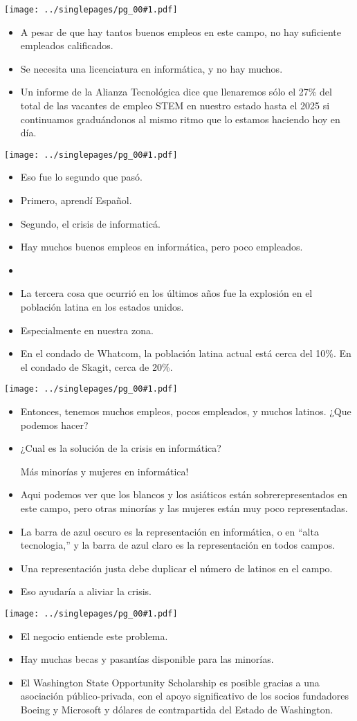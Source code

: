 \documentclass[12pt]{article}
\newcommand{\bi}{\begin{itemize}}
\newcommand{\ei}{\end{itemize}}
\newcommand{\cue}{\mbox{}
  \fbox{\sf Next slide}
}
\newcommand{\fig}[1]{
  \newpage  
  \begin{center}
    \texttt{[image: ../singlepages/pg\_00\#1.pdf]}
  \end{center}
  
}
\begin{document}
\fig{12}

\bi
\item
A pesar de que hay tantos buenos empleos en este campo,
no hay suficiente empleados calificados.
\item
Se necesita una licenciatura en informática, y no hay muchos.
\item
  Un informe de la Alianza Tecnológica dice que llenaremos sólo el 27\% del total de las vacantes de empleo STEM en nuestro estado hasta el 2025 si continuamos graduándonos al mismo ritmo que lo estamos haciendo hoy en día.
\ei

\fig{14}
\bi
\item
Eso fue lo segundo que pasó.
\item
Primero, aprendí Español.
\item
Segundo, el crisis de informaticá.
\item
Hay muchos buenos empleos en informática, pero poco empleados.
\item \cue
\item
  La tercera cosa que ocurrió en los últimos años fue la explosión en el
  población latina en los estados unidos.
\item
 Especialmente en nuestra
 zona.
\item
  En el condado de Whatcom, la población latina actual está cerca
del 10\%.  En el condado de Skagit, cerca de 20\%. 
\ei

\fig{16}

\bi
\item
Entonces, tenemos muchos empleos, pocos empleados, y muchos latinos.
¿Que podemos hacer?
\item
¿Cual es la solución de la crisis en informática?

  \cue

Más minorías y mujeres en informática!
\item
Aqui podemos ver que los blancos y los asiáticos están
sobrerepresentados en este campo, pero otras minorías y las mujeres
están muy poco representadas.
\item
  La barra de azul oscuro es la
representación en informática, o en ``alta tecnologia,'' y la barra de
azul claro es la representación en todos campos.
\item
Una representación justa debe duplicar el número de latinos en el
campo.
\item
Eso ayudaría a aliviar la crisis.
\ei

\fig{17}

\bi
\item El negocio entiende este problema.
\item
  Hay muchas becas y pasantías disponible
  para las minorías.
\item
  El Washington State Opportunity Scholarship es
posible gracias a una asociación público-privada, con el apoyo
significativo de los socios fundadores Boeing y Microsoft y dólares de
contrapartida del Estado de Washington.
\ei
\end{document}

